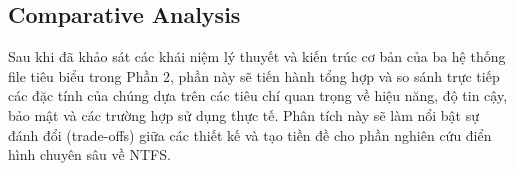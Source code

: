\documentclass[12pt]{article}
\begin{document}

\subsection{Comparative Analysis}

Sau khi đã khảo sát các khái niệm lý thuyết và kiến trúc cơ bản của ba hệ thống file tiêu biểu trong Phần 2, phần này sẽ tiến hành tổng hợp và so sánh trực tiếp các đặc tính của chúng dựa trên các tiêu chí quan trọng về hiệu năng, độ tin cậy, bảo mật và các trường hợp sử dụng thực tế. Phân tích này sẽ làm nổi bật sự đánh đổi (trade-offs) giữa các thiết kế và tạo tiền đề cho phần nghiên cứu điển hình chuyên sâu về NTFS.
\end{document}
